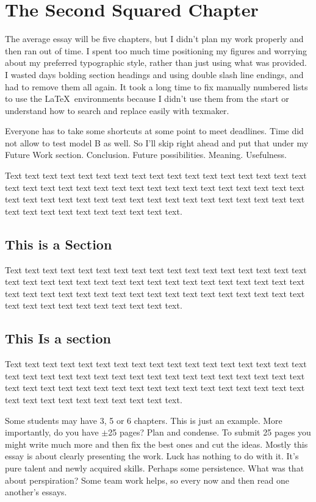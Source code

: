 \chapter{The Second Squared Chapter}

The average essay will be five chapters, but I didn't plan my work properly
and then ran out of time. I spent too much time positioning my figures and worrying
about my preferred typographic style, rather than just using what was provided.
I wasted days bolding section headings and using double slash line endings, and 
had to remove them all again. It took a long time to fix manually numbered lists
to use the \LaTeX\ environments because I didn't use them from the start or understand
how to search and replace easily with texmaker.

Everyone has to take some shortcuts
at some point to meet deadlines. Time did not allow to test model 
B as well. So I'll skip right ahead and put that under my Future Work section.
Conclusion. Future possibilities. Meaning. Usefulness.

Text text text text text text text text text text text text text text
text text text text text text text text text text text text text text
text text text text text text text text text text text text text text
text text text text text text text text text text text text text text
text text text text text.

\section{This is a Section}
Text text text text text text text text text text text text text text
text text text text text text text text text text text text text text
text text text text text text text text text text text text text text
text text text text text text text text text text text text text text
text text text text text. 

\section{This Is a section} %
Text text text text text text text text text text text text text text
text text text text text text text text text text text text text text
text text text text text text text text text text text text text text
text text text text text text text text text text text text text text
text text text text text. 

Some students may have 3, 5 or 6 chapters. This is just an example. More importantly, do you have $\pm$25 pages? Plan and condense. To submit 25 pages you might write much more and then fix the best ones and cut the ideas. Mostly this essay is about clearly presenting the work. Luck has nothing to do with it. It's pure talent and newly acquired skills. Perhaps some persistence. What was that about perspiration? Some team work helps, so every now and then read one another's essays.
